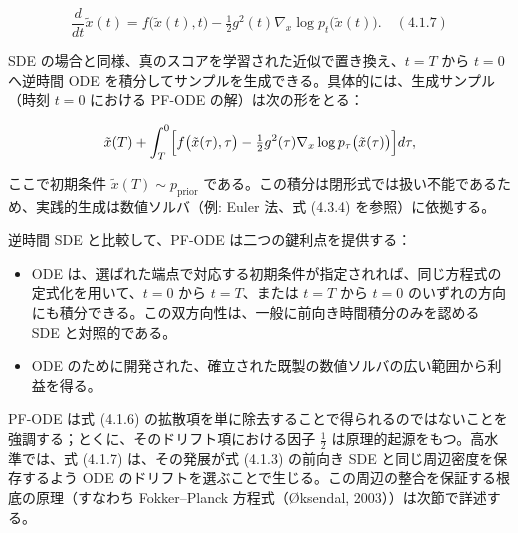 \[
\frac{d}{dt}\tilde{x}(t) = f\bigl(\tilde{x}(t),t\bigr) - \tfrac12 g^2(t)\nabla_x\log p_t\bigl(\tilde{x}(t)\bigr). \quad (4.1.7)
\]


SDE の場合と同様、真のスコアを学習された近似で置き換え、$t=T$ から $t=0$ へ逆時間 ODE を積分してサンプルを生成できる。具体的には、生成サンプル（時刻 $t=0$ における PF-ODE の解）は次の形をとる：

\[
\tilde{x}(T) + \int_T^{0}\Bigl[f\bigl(\tilde{x}(\tau),\tau\bigr)-\tfrac12 g^2(\tau)\nabla_x\log p_\tau\bigl(\tilde{x}(\tau)\bigr)\Bigr]d\tau,
\]


ここで初期条件 $\tilde{x}(T)\sim p_{\mathrm{prior}}$ である。この積分は閉形式では扱い不能であるため、実践的生成は数値ソルバ（例: Euler 法、式 (4.3.4) を参照）に依拠する。

逆時間 SDE と比較して、PF-ODE は二つの鍵利点を提供する：

\begin{itemize}
\item ODE は、選ばれた端点で対応する初期条件が指定されれば、同じ方程式の定式化を用いて、$t=0$ から $t=T$、または $t=T$ から $t=0$ のいずれの方向にも積分できる。この双方向性は、一般に前向き時間積分のみを認める SDE と対照的である。
\item ODE のために開発された、確立された既製の数値ソルバの広い範囲から利益を得る。
\end{itemize}


PF-ODE は式 (4.1.6) の拡散項を単に除去することで得られるのではないことを強調する；とくに、そのドリフト項における因子 $\tfrac12$ は原理的起源をもつ。高水準では、式 (4.1.7) は、その発展が式 (4.1.3) の前向き SDE と同じ周辺密度を保存するよう ODE のドリフトを選ぶことで生じる。この周辺の整合を保証する根底の原理（すなわち Fokker–Planck 方程式（Øksendal, 2003））は次節で詳述する。


